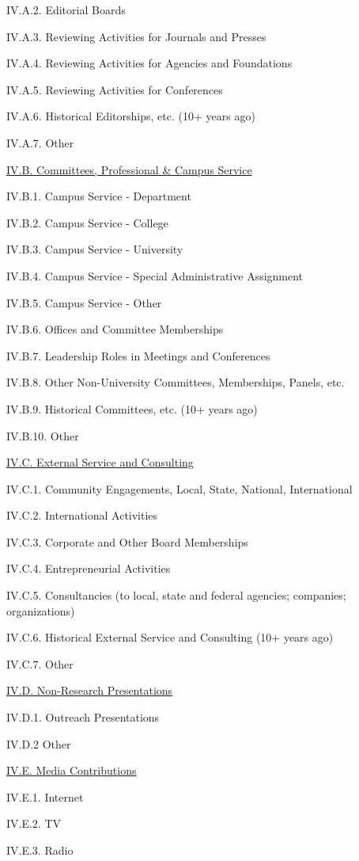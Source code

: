 \documentclass[11pt,letterpaper]{article}
\begin{document}
IV.A.2. Editorial Boards

IV.A.3. Reviewing Activities for Journals and Presses

IV.A.4. Reviewing Activities for Agencies and Foundations

IV.A.5. Reviewing Activities for Conferences

IV.A.6. Historical Editorships, etc. (10+ years ago)

IV.A.7. Other


\underline{IV.B. Committees, Professional \& Campus Service}

IV.B.1. Campus Service - Department

IV.B.2. Campus Service - College

IV.B.3. Campus Service - University

IV.B.4. Campus Service - Special Administrative Assignment

IV.B.5. Campus Service - Other

IV.B.6. Offices and Committee Memberships 

IV.B.7. Leadership Roles in Meetings and Conferences

IV.B.8. Other Non-University Committees, Memberships, Panels, etc.

IV.B.9. Historical Committees, etc. (10+ years ago)

IV.B.10. Other


\underline{IV.C. External Service and Consulting}

IV.C.1. Community Engagements, Local, State, National, International

IV.C.2. International Activities 

IV.C.3. Corporate and Other Board Memberships

IV.C.4. Entrepreneurial Activities

IV.C.5. Consultancies (to local, state and federal agencies; companies; organizations)

IV.C.6. Historical External Service and Consulting (10+ years ago)

IV.C.7. Other


\underline{IV.D. Non-Research Presentations}

IV.D.1. Outreach Presentations

IV.D.2 Other


\underline{IV.E. Media Contributions}

IV.E.1. Internet

IV.E.2. TV

IV.E.3. Radio
\end{document}

